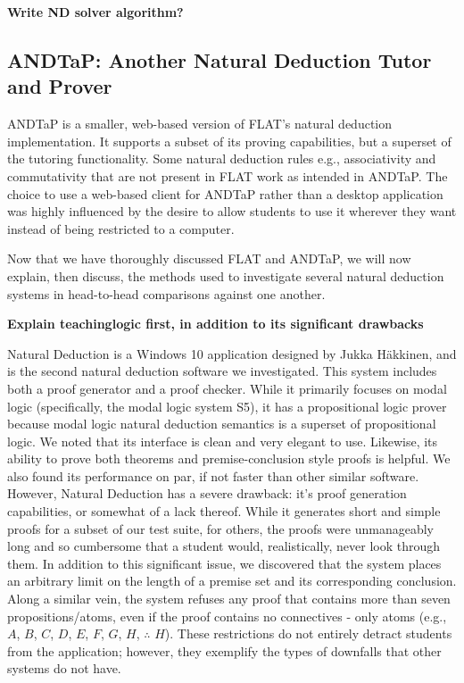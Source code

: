 \documentclass[ms]{uncgdissertationexp2}
\theoremstyle{plain}
\theoremstyle{definition}
\theoremstyle{remark}
\begin{document}
    \textbf{Write ND solver algorithm?}

    \subsection{ANDTaP: Another Natural Deduction Tutor and Prover}
    ANDTaP is a smaller, web-based version of FLAT's natural deduction implementation. It supports a subset of its proving capabilities, but a superset of the tutoring functionality. Some natural deduction rules e.g., associativity and commutativity that are not present in FLAT work as intended in ANDTaP. The choice to use a web-based client for ANDTaP rather than a desktop application was highly influenced by the desire to allow students to use it wherever they want instead of being restricted to a computer.

    Now that we have thoroughly discussed FLAT and ANDTaP, we will now explain, then discuss, the methods used to investigate several natural deduction systems in head-to-head comparisons against one another.

    \textbf{Explain teachinglogic first, in addition to its significant drawbacks}

    Natural Deduction is a Windows 10 application designed by Jukka H\"akkinen, and is the second natural deduction software we investigated. This system includes both a proof generator and a proof checker. While it primarily focuses on modal logic (specifically, the modal logic system S5), it has a propositional logic prover because modal logic natural deduction semantics is a superset of propositional logic. We noted that its interface is clean and very elegant to use. Likewise, its ability to prove both theorems and premise-conclusion style proofs is helpful. We also found its performance on par, if not faster than other similar software. However, Natural Deduction has a severe drawback: it's proof generation capabilities, or somewhat of a lack thereof. While it generates short and simple proofs for a subset of our test suite, for others, the proofs were unmanageably long and so cumbersome that a student would, realistically, never look through them. In addition to this significant issue, we discovered that the system places an arbitrary limit on the length of a premise set and its corresponding conclusion. Along a similar vein, the system refuses any proof that contains more than seven propositions/atoms, even if the proof contains no connectives - only atoms (e.g., $A$, $B$, $C$, $D$, $E$, $F$, $G$, $H$, $\therefore$ $H$). These restrictions do not entirely detract students from the application; however, they exemplify the types of downfalls that other systems do not have.
\end{document}
